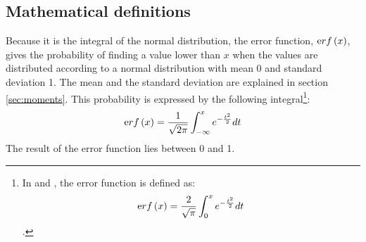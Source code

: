 \subsection{Mathematical definitions}
\label{sec:errorFunctionDef} Because it is the integral of the
normal distribution, the error function, $\mathop{\textrm erf}\left(x\right)$,
gives the probability of finding a value lower than $x$ when the
values are distributed according to a normal distribution with
mean 0 and standard deviation 1. The mean and the standard
deviation are explained in section \ref{sec:moments}. This
probability is expressed by the following integral\footnote{In
\cite{AbrSteg} and \cite{Press}, the error function is defined as:
$$\mathop{\textrm erf}\left(x\right)={2 \over \sqrt{\pi}}\int_0^x e^{-{t^2 \over 2
}}dt$$.}:
\begin{equation}
\mathop{\textrm erf}\left(x\right)={1 \over \sqrt{2\pi}}\int_{-\infty}^x e^{-{t^2
\over 2 }}dt
\end{equation}
The result of the error function lies between 0 and 1.

